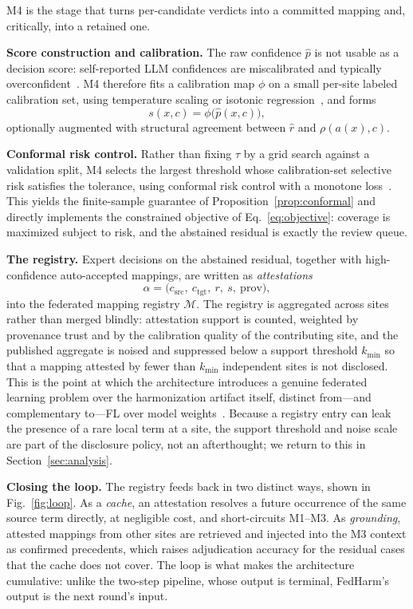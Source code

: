 \documentclass[conference]{IEEEtran}
\newcommand{\rel}{\rho}
\newcommand{\reg}{\mathcal{M}}
\begin{document}
M4 is the stage that turns per-candidate verdicts into a committed mapping and, critically, into a retained one.

\textbf{Score construction and calibration.} The raw confidence $\hat{p}$ is not usable as a decision score: self-reported LLM confidences are miscalibrated and typically overconfident~\cite{b19,b28}. M4 therefore fits a calibration map $\phi$ on a small per-site labeled calibration set, using temperature scaling or isotonic regression~\cite{b19,b47}, and forms
\begin{equation}
s(x,c) = \phi\big(\hat{p}(x,c)\big),
\end{equation}
optionally augmented with structural agreement between $\hat{r}$ and $\rel(a(x),c)$.

\textbf{Conformal risk control.} Rather than fixing $\tau$ by a grid search against a validation split, M4 selects the largest threshold whose calibration-set selective risk satisfies the tolerance, using conformal risk control with a monotone loss~\cite{b22,b23}. This yields the finite-sample guarantee of Proposition~\ref{prop:conformal} and directly implements the constrained objective of Eq.~\eqref{eq:objective}: coverage is maximized subject to risk, and the abstained residual is exactly the review queue.

\textbf{The registry.} Expert decisions on the abstained residual, together with high-confidence auto-accepted mappings, are written as \emph{attestations}
\begin{equation}
\alpha = \big(c_{\text{src}},\ c_{\text{tgt}},\ r,\ s,\ \mathrm{prov}\big),
\end{equation}
into the federated mapping registry $\reg$. The registry is aggregated across sites rather than merged blindly: attestation support is counted, weighted by provenance trust and by the calibration quality of the contributing site, and the published aggregate is noised and suppressed below a support threshold $k_{\min}$ so that a mapping attested by fewer than $k_{\min}$ independent sites is not disclosed. This is the point at which the architecture introduces a genuine federated learning problem over the harmonization artifact itself, distinct from---and complementary to---FL over model weights~\cite{b24,b25,b26}. Because a registry entry can leak the presence of a rare local term at a site, the support threshold and noise scale are part of the disclosure policy, not an afterthought; we return to this in Section~\ref{sec:analysis}.

\textbf{Closing the loop.} The registry feeds back in two distinct ways, shown in Fig.~\ref{fig:loop}. As a \emph{cache}, an attestation resolves a future occurrence of the same source term directly, at negligible cost, and short-circuits M1--M3. As \emph{grounding}, attested mappings from other sites are retrieved and injected into the M3 context as confirmed precedents, which raises adjudication accuracy for the residual cases that the cache does not cover. The loop is what makes the architecture cumulative: unlike the two-step pipeline, whose output is terminal, FedHarm's output is the next round's input.
\end{document}
